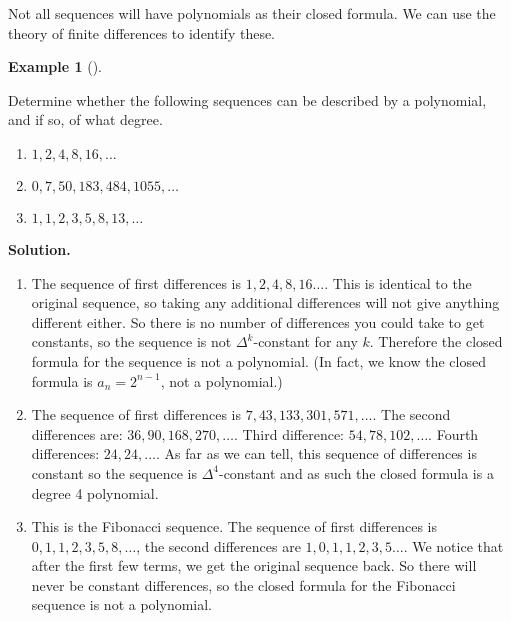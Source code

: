 \documentclass[10pt,]{book}
\theoremstyle{plain}
\theoremstyle{definition}
\newtheorem{example}[theorem]{Example}
\theoremstyle{definition}
\theoremstyle{definition}
\numberwithin{equation}{chapter}
\begin{document}
Not all sequences will have polynomials as their closed formula. We can use the theory of finite differences to identify these.
%
\begin{example}[]\label{example-71}

Determine whether the following sequences can be described by a polynomial, and if so, of what degree.
\leavevmode%
\begin{enumerate}
\item\hypertarget{li-923}{}\(1, 2, 4, 8, 16, \ldots\)%
\item\hypertarget{li-924}{}\(0, 7, 50, 183, 484, 1055, \ldots\)%
\item\hypertarget{li-925}{}\(1,1,2,3,5,8,13,\ldots\)%
\end{enumerate}

%
\par\medskip\noindent%
\textbf{Solution.}\quad
\leavevmode%
\begin{enumerate}
\item\hypertarget{li-926}{}
The sequence of first differences is \(1, 2, 4, 8, 16\ldots\).  This is identical to the original sequence, so taking any additional differences will not give anything different either.  So there is no number of differences you could take to get constants, so the sequence is not \(\Delta^k\)-constant for any \(k\).  Therefore the closed formula for the sequence is not a polynomial.  (In fact, we know the closed formula is \(a_n = 2^{n-1}\), not a polynomial.)
%
\item\hypertarget{li-927}{}
The sequence of first differences is \(7, 43, 133, 301, 571,\ldots\).  The second differences are: \(36, 90, 168, 270,\ldots\).  Third difference: \(54, 78, 102,\ldots\).  Fourth differences: \(24, 24, \ldots\).  As far as we can tell, this sequence of differences is constant so the sequence is \(\Delta^4\)-constant and as such the closed formula is a degree 4 polynomial.
%
\item\hypertarget{li-928}{}
This is the Fibonacci sequence.  The sequence of first differences is \(0, 1, 1, 2, 3, 5, 8, \ldots\), the second differences are \(1, 0, 1, 1, 2, 3, 5\ldots\).  We notice that after the first few terms, we get the original sequence back.  So there will never be constant differences, so the closed formula for the Fibonacci sequence is not a polynomial.
%
\end{enumerate}

%
\end{example}
\typeout{************************************************}
\typeout{************************************************}
\end{document}

